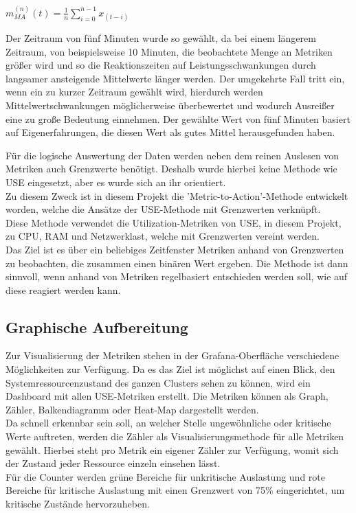 \documentclass[a4paper,10pt]{scrartcl}
\begin{document}
\begin{Huge}
\(
\displaystyle{m^{(n)}_{MA}(t) = \frac{1}{n}{\sum\limits_{i=0}^{{n-1}} x_{(t-i)}} }
\)\\

\end{Huge}

Der Zeitraum von fünf Minuten wurde so gewählt, da bei einem längerem Zeitraum, von beispielsweise 10 Minuten, die beobachtete Menge an Metriken größer wird und so die Reaktionszeiten auf Leistungsschwankungen durch langsamer ansteigende Mittelwerte länger werden.
Der umgekehrte Fall tritt ein, wenn ein zu kurzer Zeitraum gewählt wird, hierdurch werden Mittelwertschwankungen möglicherweise überbewertet und wodurch Ausreißer eine zu große Bedeutung einnehmen.
Der gewählte Wert von fünf Minuten basiert auf Eigenerfahrungen, die diesen Wert als gutes Mittel herausgefunden haben.

Für die logische Auswertung der Daten werden neben dem reinen Auslesen von Metriken auch Grenzwerte benötigt. Deshalb wurde hierbei keine Methode wie USE eingesetzt, aber es wurde sich an ihr orientiert.\\
Zu diesem Zweck ist in diesem Projekt die 'Metric-to-Action'-Methode entwickelt worden, welche die Ansätze der USE-Methode mit Grenzwerten verknüpft.\\
Diese Methode verwendet die Utilization-Metriken von USE, in diesem Projekt, zu CPU, RAM und Netzwerklast, welche mit Grenzwerten vereint werden.\\
Das Ziel ist es über ein beliebiges Zeitfenster Metriken anhand von Grenzwerten zu beobachten, die zusammen einen binären Wert ergeben. Die Methode ist dann sinnvoll, wenn anhand von Metriken regelbasiert entschieden werden soll, wie auf diese reagiert werden kann.

\subsection{Graphische Aufbereitung}

Zur Visualisierung der Metriken stehen in der Grafana-Oberfläche verschiedene Möglichkeiten zur Verfügung. Da es das Ziel ist möglichst auf einen Blick, den Systemressourcenzustand des ganzen Clusters sehen zu können, wird ein Dashboard mit allen USE-Metriken erstellt. Die Metriken können als Graph, Zähler, Balkendiagramm oder Heat-Map dargestellt werden.\\
Da schnell erkennbar sein soll, an welcher Stelle ungewöhnliche oder kritische Werte auftreten, werden die Zähler als Visualisierungsmethode für alle Metriken gewählt. Hierbei steht pro Metrik ein eigener Zähler zur Verfügung, womit sich der Zustand jeder Ressource einzeln einsehen lässt.\\
Für die Counter werden grüne Bereiche für unkritische Auslastung und rote Bereiche für kritische Auslastung mit einen Grenzwert von 75\% eingerichtet, um kritische Zustände hervorzuheben.
\end{document}
